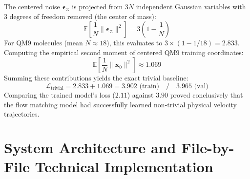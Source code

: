 \documentclass[12pt, a4paper]{article}
\begin{document}
The centered noise $\boldsymbol{\epsilon}_{\mathcal{Z}}$ is projected from $3N$ independent Gaussian variables with $3$ degrees of freedom removed (the center of mass):
\begin{equation}
    \mathbb{E}\left[ \frac{1}{N} \|\boldsymbol{\epsilon}_{\mathcal{Z}}\|^2 \right] = 3\left(1 - \frac{1}{N}\right)
\end{equation}
For QM9 molecules (mean $N \approx 18$), this evaluates to $3 \times (1 - 1/18) = 2.833$.
Computing the empirical second moment of centered QM9 training coordinates:
\begin{equation}
    \mathbb{E}\left[ \frac{1}{N} \|\mathbf{x}_0\|^2 \right] \approx 1.069
\end{equation}
Summing these contributions yields the exact trivial baseline:
\begin{equation}
    \mathcal{L}_\text{trivial} = 2.833 + 1.069 = \mathbf{3.902} \text{ (train)} \quad / \quad \mathbf{3.965} \text{ (val)}
\end{equation}
Comparing the trained model's loss ($2.11$) against $3.90$ proved conclusively that the flow matching model had successfully learned non-trivial physical velocity trajectories.

\section{System Architecture and File-by-File Technical Implementation}
\end{document}
